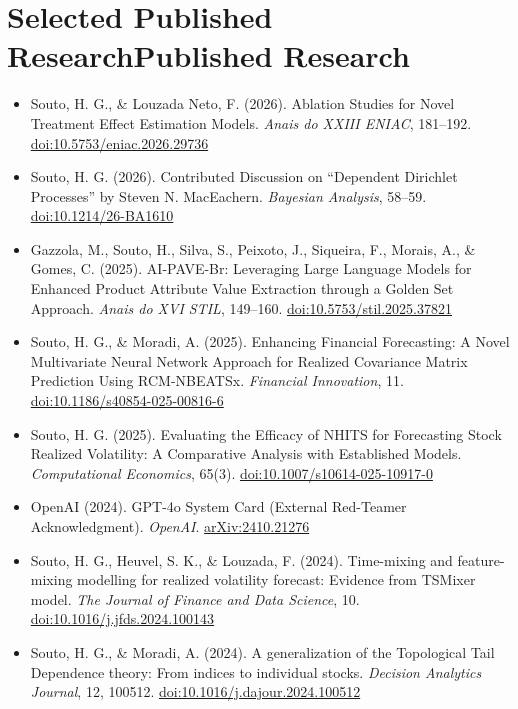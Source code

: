 \documentclass[10pt,a4paper]{article}
\begin{document}
\section{\ifshortcv Selected Published Research\else Published Research\fi}
\begin{itemize}
    \item Souto, H. G., \& Louzada Neto, F. (2026). Ablation Studies for Novel Treatment Effect Estimation Models. \textit{Anais do XXIII ENIAC}, 181--192. \href{https://doi.org/10.5753/eniac.2026.29736}{doi:10.5753/eniac.2026.29736}
    \item Souto, H. G. (2026). Contributed Discussion on ``Dependent Dirichlet Processes'' by Steven N. MacEachern. \textit{Bayesian Analysis}, 58--59. \href{https://doi.org/10.1214/26-BA1610}{doi:10.1214/26-BA1610}
    \item Gazzola, M., Souto, H., Silva, S., Peixoto, J., Siqueira, F., Morais, A., \& Gomes, C. (2025). AI-PAVE-Br: Leveraging Large Language Models for Enhanced Product Attribute Value Extraction through a Golden Set Approach. \textit{Anais do XVI STIL}, 149--160. \href{https://doi.org/10.5753/stil.2025.37821}{doi:10.5753/stil.2025.37821}
    \item Souto, H. G., \& Moradi, A. (2025). Enhancing Financial Forecasting: A Novel Multivariate Neural Network Approach for Realized Covariance Matrix Prediction Using RCM-NBEATSx. \textit{Financial Innovation}, 11. \href{https://doi.org/10.1186/s40854-025-00816-6}{doi:10.1186/s40854-025-00816-6}
    \item Souto, H. G. (2025). Evaluating the Efficacy of NHITS for Forecasting Stock Realized Volatility: A Comparative Analysis with Established Models. \textit{Computational Economics}, 65(3). \href{https://doi.org/10.1007/s10614-025-10917-0}{doi:10.1007/s10614-025-10917-0}
    \item OpenAI (2024). GPT-4o System Card (External Red-Teamer Acknowledgment). \textit{OpenAI}. \href{https://doi.org/10.48550/arXiv.2410.21276}{arXiv:2410.21276}
    \item Souto, H. G., Heuvel, S. K., \& Louzada, F. (2024). Time-mixing and feature-mixing modelling for realized volatility forecast: Evidence from TSMixer model. \textit{The Journal of Finance and Data Science}, 10. \href{https://doi.org/10.1016/j.jfds.2024.100143}{doi:10.1016/j.jfds.2024.100143}
    \item Souto, H. G., \& Moradi, A. (2024). A generalization of the Topological Tail Dependence theory: From indices to individual stocks. \textit{Decision Analytics Journal}, 12, 100512. \href{https://doi.org/10.1016/j.dajour.2024.100512}{doi:10.1016/j.dajour.2024.100512}

\end{itemize}
\end{document}
